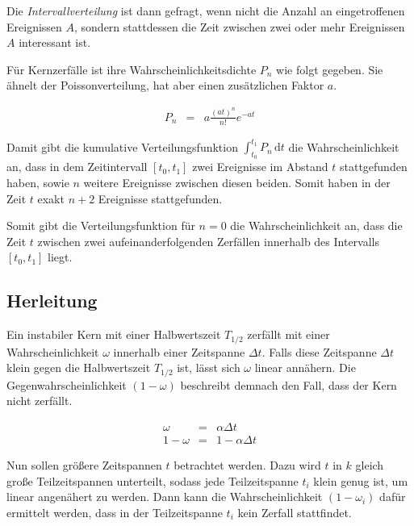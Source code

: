 \documentclass[12pt,a4paper]{scrartcl}
\numberwithin{equation}{section} %
\begin{document}
\noindent
Die \emph{Intervallverteilung} ist dann gefragt, wenn nicht die Anzahl an eingetroffenen Ereignissen $A$, sondern stattdessen die Zeit zwischen zwei oder mehr Ereignissen $A$ interessant ist.

Für Kernzerfälle ist ihre Wahrscheinlichkeitsdichte $P_n$ wie folgt gegeben. Sie ähnelt der Poissonverteilung, hat aber einen zusätzlichen Faktor $a$.

\begin{eqnarray}
	P_n &=& a \frac{(at)^n}{n!} e^{-at} \label{eq:Intervallverteilung}
\end{eqnarray}

\noindent
Damit gibt die kumulative Verteilungsfunktion $\int_{t_0}^{t_1} P_n \,\mathrm dt \label{eq:P_n_int}$ die Wahrscheinlichkeit an, dass in dem Zeitintervall $[t_0,t_1]$ zwei Ereignisse im Abstand $t$ stattgefunden haben, sowie $n$ weitere Ereignisse zwischen diesen beiden. Somit haben in der Zeit $t$ exakt $n+2$ Ereignisse stattgefunden.

Somit gibt die Verteilungsfunktion für $n=0$ die Wahrscheinlichkeit an, dass die Zeit $t$ zwischen zwei aufeinanderfolgenden Zerfällen innerhalb des Intervalls $[t_0, t_1]$ liegt.

\hypertarget{Herleitung Intervallverteilung}{\subsection{Herleitung}\label{Herleitung Intervallverteilung}}
Ein instabiler Kern mit einer Halbwertszeit $T_{1/2}$ zerfällt mit einer Wahrscheinlichkeit $\omega$ innerhalb einer Zeitspanne $\Delta t$. Falls diese Zeitspanne $\Delta t$ klein gegen die Halbwertszeit $T_{1/2}$ ist, lässt sich $\omega$ linear annähern. Die Gegenwahrscheinlichkeit $(1-\omega)$ beschreibt demnach den Fall, dass der Kern nicht zerfällt.

\begin{eqnarray}
	\omega &=& \alpha \Delta t \label{eq:Zerfallswkt linear} \\
	1 - \omega &=& 1 - \alpha \Delta t
\end{eqnarray}

\noindent
Nun sollen größere Zeitspannen $t$ betrachtet werden. Dazu wird $t$ in $k$ gleich große Teilzeitspannen unterteilt, sodass jede Teilzeitspanne $t_i$ klein genug ist, um linear angenähert zu werden. Dann kann die Wahrscheinlichkeit $(1 - \omega_i)$ dafür ermittelt werden, dass in der Teilzeitspanne $t_i$ kein Zerfall stattfindet.
\end{document}
